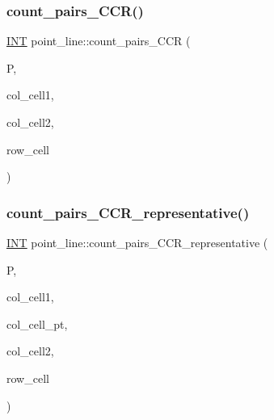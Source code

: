 \mbox{\label{classpoint__line_ae8fefa4ca65597460be67505c0706eb1}} 
\subsubsection{\texorpdfstring{count\+\_\+pairs\+\_\+\+C\+C\+R()}{count\_pairs\_CCR()}}
{\footnotesize\ttfamily \mbox{\hyperlink{galois_8h_a09fddde158a3a20bd2dcadb609de11dc}{I\+NT}} point\+\_\+line\+::count\+\_\+pairs\+\_\+\+C\+CR (\begin{DoxyParamCaption}\item[{\mbox{\hyperlink{classpartitionstack}{partitionstack}} \&}]{P,  }\item[{\mbox{\hyperlink{galois_8h_a09fddde158a3a20bd2dcadb609de11dc}{I\+NT}}}]{col\+\_\+cell1,  }\item[{\mbox{\hyperlink{galois_8h_a09fddde158a3a20bd2dcadb609de11dc}{I\+NT}}}]{col\+\_\+cell2,  }\item[{\mbox{\hyperlink{galois_8h_a09fddde158a3a20bd2dcadb609de11dc}{I\+NT}}}]{row\+\_\+cell }\end{DoxyParamCaption})}

\mbox{\label{classpoint__line_aeb80b29d50e5d9c9dfb77926bbd5c0d3}} 
\subsubsection{\texorpdfstring{count\+\_\+pairs\+\_\+\+C\+C\+R\+\_\+representative()}{count\_pairs\_CCR\_representative()}}
{\footnotesize\ttfamily \mbox{\hyperlink{galois_8h_a09fddde158a3a20bd2dcadb609de11dc}{I\+NT}} point\+\_\+line\+::count\+\_\+pairs\+\_\+\+C\+C\+R\+\_\+representative (\begin{DoxyParamCaption}\item[{\mbox{\hyperlink{classpartitionstack}{partitionstack}} \&}]{P,  }\item[{\mbox{\hyperlink{galois_8h_a09fddde158a3a20bd2dcadb609de11dc}{I\+NT}}}]{col\+\_\+cell1,  }\item[{\mbox{\hyperlink{galois_8h_a09fddde158a3a20bd2dcadb609de11dc}{I\+NT}}}]{col\+\_\+cell\+\_\+pt,  }\item[{\mbox{\hyperlink{galois_8h_a09fddde158a3a20bd2dcadb609de11dc}{I\+NT}}}]{col\+\_\+cell2,  }\item[{\mbox{\hyperlink{galois_8h_a09fddde158a3a20bd2dcadb609de11dc}{I\+NT}}}]{row\+\_\+cell }\end{DoxyParamCaption})}

